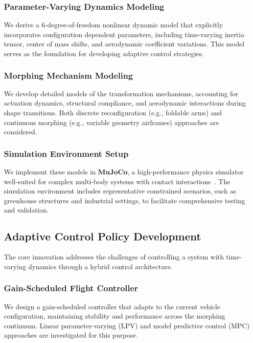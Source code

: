 \documentclass[11pt,a4paper]{article}
\begin{document}
\subsubsection{Parameter-Varying Dynamics Modeling}
We derive a 6-degree-of-freedom nonlinear dynamic model that explicitly incorporates configuration dependent parameters, including time-varying inertia tensor, center of mass shifts, and aerodynamic coefficient variations. This model serves as the foundation for developing adaptive control strategies.

\subsubsection{Morphing Mechanism Modeling}
We develop detailed models of the transformation mechanisms, accounting for actuation dynamics, structural compliance, and aerodynamic interactions during shape transitions. Both discrete reconfiguration (e.g., foldable arms) and continuous morphing (e.g., variable geometry airframes) approaches are considered.

\subsubsection{Simulation Environment Setup}
We implement these models in \textbf{MuJoCo}, a high-performance physics simulator well-suited for complex multi-body systems with contact interactions~\cite{todorov2012mujoco}. The simulation environment includes representative constrained scenarios, such as greenhouse structures and industrial settings, to facilitate comprehensive testing and validation.

\subsection{Adaptive Control Policy Development}
The core innovation addresses the challenges of controlling a system with time-varying dynamics through a hybrid control architecture.

\subsubsection{Gain-Scheduled Flight Controller}
We design a gain-scheduled controller that adapts to the current vehicle configuration, maintaining stability and performance across the morphing continuum. Linear parameter-varying (LPV) and model predictive control (MPC) approaches are investigated for this purpose.
\end{document}
